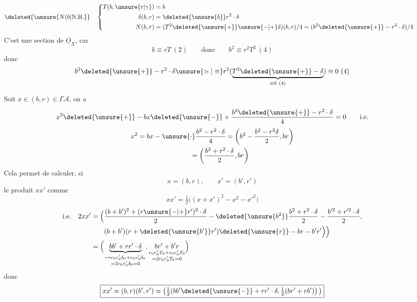 \[
\deleted{\unsure{N(b|\mathrm{N.B.}}}\quad\begin{aligned}&\left\{\begin{aligned}T(b,\unsure{r|\gamma})&=b\\ \delta(b,r)&=\deleted{\unsure{b}}r^2\cdot\delta\\ N(b,r)&=(T^2\deleted{\unsure{+}}\unsure{-|+}\delta)(b,r)/4=(b^2\deleted{\unsure{+}}-r^2\cdot\delta)/4\end{aligned}\right. \end{aligned}
\]
C'est une section de $\underline O_X$, car
\[
b\equiv rT\ (2)\qquad\text{donc}\qquad b^2\equiv r^2T^2\ (4)
\]
donc
\[
b^2\deleted{\unsure{+}}-r^2\cdot\delta\unsure{\simeq|\equiv}r^2(\underbrace{T^2\deleted{\unsure{+}}-\delta}_{\equiv0\ (4)})\equiv0\ (4)
\]

Soit $\underline{x\in(b,r)}\in\Gamma\mathcal A$, on a
\[
x^2\deleted{\unsure{+}}-bx\deleted{\unsure{-}}+\frac{b^2\deleted{\unsure{+}}-r^2\cdot\delta}{4}=0\qquad\text{i.e.}
\]
\[
\begin{aligned}x^2&=bx-\unsure{\cdot}\frac{b^2-r^2\cdot\delta}{4}=\left(b^2-\frac{b^2-r^2\delta}{2},br\right)\\ &\phantom{=bx-\frac{b^2-r^2\cdot\delta}{4}}=\left(\frac{b^2+r^2\cdot\delta}{2},br\right)\end{aligned}
\]
Cela permet de calculer, si
\[
x=(b,r),\qquad x'=(b',r')
\]
le produit $xx'$ comme
\[
xx'=\tfrac12\big((x+x')^2-x^2-x'^2\big)
\]
\[
\begin{aligned}\text{i.e.}\quad 2xx'=\Big(&\frac{(b+b')^2+(r\unsure{-|+}r')^2\cdot\delta}{2}-\deleted{\unsure{b^2}}\frac{b^2+r^2\cdot\delta}{2}-\frac{b'^2+r'^2\cdot\delta}{2},\\ &(b+b')(r+\deleted{\unsure{b'}}r')\deleted{\unsure{r}}-br-b'r'\Big)\Big)\\ =\Big(&\underbrace{bb'+rr'\cdot\delta}_{\substack{\mapsto r_0r'_0\delta_0+r_0r'_0\delta_0\\=2r_0r'_0\delta_0=0}},\underset{\substack{r_0r'_0T_0+r_0r'_0T_0\\=2r_0r'_0T_0=0}}{br'+b'r}\Big)\end{aligned}
\]
donc
\[
\boxed{xx'=(b,r)(b',r')=\left(\tfrac12(bb'\deleted{\unsure{-}}+rr'\cdot\delta,\tfrac12(br'+rb')\right)\big)}
\]
